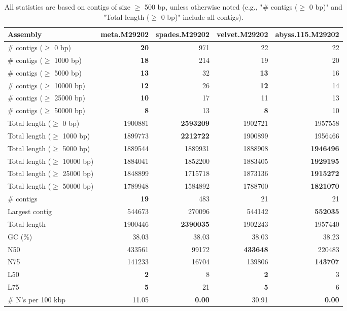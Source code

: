 \documentclass[12pt,a4paper]{article}
\begin{document}
\begin{table}[ht]
\begin{center}
\caption{All statistics are based on contigs of size $\geq$ 500 bp, unless otherwise noted (e.g., "\# contigs ($\geq$ 0 bp)" and "Total length ($\geq$ 0 bp)" include all contigs).}
\begin{tabular}{|l*{4}{|r}|}
\hline
Assembly & meta.M29202 & spades.M29202 & velvet.M29202 & abyss.115.M29202 \\ \hline
\# contigs ($\geq$ 0 bp) & {\bf 20} & 971 & 22 & 22 \\ \hline
\# contigs ($\geq$ 1000 bp) & {\bf 18} & 214 & 19 & 20 \\ \hline
\# contigs ($\geq$ 5000 bp) & {\bf 13} & 32 & {\bf 13} & 16 \\ \hline
\# contigs ($\geq$ 10000 bp) & {\bf 12} & 26 & {\bf 12} & 14 \\ \hline
\# contigs ($\geq$ 25000 bp) & {\bf 10} & 17 & 11 & 13 \\ \hline
\# contigs ($\geq$ 50000 bp) & {\bf 8} & 13 & {\bf 8} & 10 \\ \hline
Total length ($\geq$ 0 bp) & 1900881 & {\bf 2593209} & 1902721 & 1957558 \\ \hline
Total length ($\geq$ 1000 bp) & 1899773 & {\bf 2212722} & 1900899 & 1956466 \\ \hline
Total length ($\geq$ 5000 bp) & 1889544 & 1889931 & 1888908 & {\bf 1946496} \\ \hline
Total length ($\geq$ 10000 bp) & 1884041 & 1852200 & 1883405 & {\bf 1929195} \\ \hline
Total length ($\geq$ 25000 bp) & 1848899 & 1715718 & 1873136 & {\bf 1915272} \\ \hline
Total length ($\geq$ 50000 bp) & 1789948 & 1584892 & 1788700 & {\bf 1821070} \\ \hline
\# contigs & {\bf 19} & 483 & 21 & 21 \\ \hline
Largest contig & 544673 & 270096 & 544142 & {\bf 552035} \\ \hline
Total length & 1900446 & {\bf 2390035} & 1902243 & 1957440 \\ \hline
GC (\%) & 38.03 & 38.03 & 38.03 & 38.23 \\ \hline
N50 & 433561 & 99172 & {\bf 433648} & 220483 \\ \hline
N75 & 141233 & 16704 & 139806 & {\bf 143707} \\ \hline
L50 & {\bf 2} & 8 & {\bf 2} & 3 \\ \hline
L75 & {\bf 5} & 21 & {\bf 5} & 6 \\ \hline
\# N's per 100 kbp & 11.05 & {\bf 0.00} & 30.91 & {\bf 0.00} \\ \hline
\end{tabular}
\end{center}
\end{table}
\end{document}
